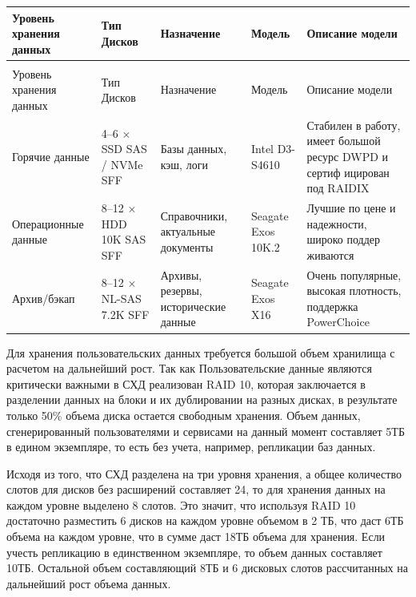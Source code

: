 \documentclass[14pt, a4paper]{extarticle}
\begin{document}
\begin{tabularx}{\textwidth}{|l|X|X|X|X|}
  \caption{Уровни хранения данных СХД\label{tab:DSS_storage_levels}}                                                                                                                         \\
  \hline
  Уровень хранения данных & Тип Дисков               & Назначение                           & Модель             & Описание модели                                                           \\\hline
  \endfirsthead
  \caption*{Продолжение таблицы~\ref{tab:DSS_storage_levels}}                                                                                                                                \\
  \hline
  Уровень хранения данных & Тип Дисков               & Назначение                           & Модель             & Описание модели                                                           \\\hline
  \endhead
  \endfoot
  \endlastfoot

  Горячие данные          & 4–6 × SSD SAS / NVMe SFF & Базы данных, кэш, логи               & Intel D3-S4610     & Стабилен в работу, имеет большой ресурс DWPD и сертиф ицирован под RAIDIX \\\hline
  Операционные данные     & 8–12 × HDD 10K SAS   SFF & Справочники, актуальные документы    & Seagate Exos 10K.2 & Лучшие по цене и надежности, широко поддер живаются                       \\\hline
  Архив/бэкап             & 8–12 × NL-SAS 7.2K   SFF & Архивы, резервы, исторические данные & Seagate Exos X16   & Очень популярные, высокая плотность, поддержка PowerChoice                \\\hline
\end{tabularx}

Для хранения пользовательских данных требуется большой объем
хранилища с расчетом на дальнейший рост. Так как Пользовательские данные являются
критически важными в СХД реализован RAID 10, которая заключается в
разделении данных на блоки и их дублировании на разных дисках, в результате
только 50\% объема диска остается свободным хранения.
Объем данных, сгенерированный пользователями и сервисами на данный момент
составляет 5ТБ в едином экземпляре, то есть без учета, например, репликации
баз данных.

Исходя из того, что СХД разделена на три уровня хранения, а общее количество
слотов для дисков без расширений составляет 24, то для хранения данных на каждом
уровне выделено 8 слотов. Это значит, что используя RAID 10
достаточно разместить 6 дисков на каждом уровне объемом в 2 ТБ, что даст 6ТБ
объема на каждом уровне, что в сумме даст 18ТБ объема для хранения.
Если учесть репликацию в единственном экземпляре, то объем данных
составляет 10ТБ. Остальной объем составляющий 8ТБ и 6 дисковых слотов
рассчитанных на дальнейший рост объема данных.
\end{document}
